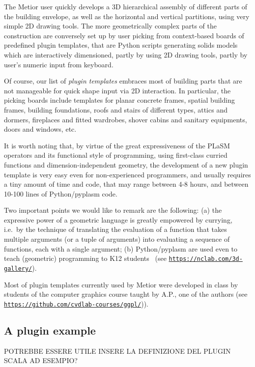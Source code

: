 The Metior user quickly develops a 3D hierarchical assembly of different parts of the building envelope, as well as the horizontal and vertical partitions, using very simple 2D drawing tools. The more geometrically complex parts of the construction are conversely set up by user picking from context-based boards of predefined plugin templates, that are Python scripts generating solids models which are interactively dimensioned, partly by using 2D drawing tools, partly by user's numeric input from keyboard. 

Of course, our list of \emph{plugin templates} embraces most of building parts that are not manageable for quick shape input via 2D interaction. In particular, the picking boards include templates for planar concrete frames, spatial building frames, building foundations, roofs and stairs of different types, attics and dormers, fireplaces and fitted wardrobes, shover cabins and sanitary equipments, doors and windows, etc.

It is worth noting that, by virtue of the great expressiveness of the PLaSM operators and its functional style of programming, using first-class curried functions and dimension-independent geometry, the development of a new plugin template is very easy even for non-experienced programmers, and usually requires a tiny amount of time and code, that may range between 4-8 hours, and between 10-100 lines of Python/pyplasm code. 

Two important points we would like to remark are the following: (a) the expressive power of a geometric language is greatly empowered by  currying, i.e.~by the technique of translating the evaluation of a function that takes multiple arguments (or a tuple of arguments) into evaluating a sequence of functions, each with a single argument; (b) Python/pyplasm are used even to teach (geometric) programming to K12 students~\cite{ncLab} (see \href{https://nclab.com/3d-gallery/}{\texttt{https://nclab.com/3d-gallery/}}). 

Most of plugin templates currently used by Metior were developed in class by students of the computer  graphics course taught by A.P., one of the authors (see \href{https://github.com/cvdlab-courses/ggpl/blob/master/slides.md}{\texttt{https://github.com/cvdlab-courses/ggpl/}})). 

\subsection{A plugin example}

POTREBBE ESSERE UTILE INSERE LA DEFINIZIONE DEL PLUGIN SCALA AD ESEMPIO?

